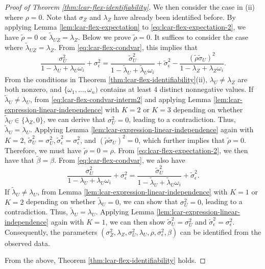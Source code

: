 \documentclass[11pt]{article}
\theoremstyle{definition}
\theoremstyle{remark}
\begin{document}
\begin{proof}[Proof of Theorem \ref{thm:lcar-flex-identifiability}]
We then consider the case in (ii) where $\rho =0$. Note that  $\sigma_Z$ and $\lambda_Z$ have already been identified before. By applying Lemma \ref{lem:lcar-flex-expectation} to \eqref{eq:lcar-flex-expectation-2}, we have $\tilde\rho =0$ or $\tilde\lambda_{UZ} = \lambda_Z$.
Below we prove $\tilde\rho =0$. 
It suffices to consider
the case where $\tilde\lambda_{UZ} =\lambda_Z$. From \eqref{eq:lcar-flex-condvar}, this implies that 
\begin{equation}\label{eq:lcar-flex-condvar-interm2}
\frac{\sigma_U^2}{1-\lambda_U+\lambda_U\omega_i} + \sigma_\epsilon^2 = \frac{\tilde\sigma_U^2}{1-\tilde\lambda_U+\tilde\lambda_U\omega_i} + \tilde\sigma_\epsilon^2 - \frac{(\tilde\rho\tilde\sigma_U)^2}{1-\lambda_Z +\lambda_Z\omega_i}.
\end{equation}
From the conditions in Theorem \ref{thm:lcar-flex-identifiability}(ii), $\lambda_U \ne \lambda_Z$ are both nonzero, and $\{\omega_1,\ldots,\omega_n)$ contains at least 4 distinct nonnegative values. 
If $\tilde\lambda_U \neq \lambda_U$, from \eqref{eq:lcar-flex-condvar-interm2} and applying Lemma \ref{lem:lcar-expression-linear-independence} with $K=2$ or $K=3$ depending on whether $\tilde\lambda_U\in\{\lambda_Z, 0\}$, we can derive that $\sigma_U^2=0$, leading to a contradiction. Thus, $\tilde\lambda_U = \lambda_U$. Applying Lemma \ref{lem:lcar-expression-linear-independence} again with $K=2$,  $\tilde\sigma_U^2 = \sigma_U^2, \tilde\sigma_\epsilon^2 = \sigma_\epsilon^2$, and $(\tilde\rho \tilde\sigma_U)^2=0$, which further implies that $\tilde\rho =0$. Therefore, we must have  $\tilde\rho=0 = \rho$. 
From \eqref{eq:lcar-flex-expectation-2}, we then have that $\tilde\beta = \beta$. From \eqref{eq:lcar-flex-condvar}, we also have
\[\frac{\sigma_U^2}{1-\lambda_U+\lambda_U \omega_i} + \sigma_\epsilon^2 = \frac{\tilde\sigma_U^2}{1-\tilde\lambda_U + \tilde\lambda_U \omega_i} + \tilde\sigma_\epsilon^2. \]
If $\tilde\lambda_U\neq \lambda_U $, from Lemma \ref{lem:lcar-expression-linear-independence} with $K=1$ or $K=2$ depending on whether $\tilde\lambda_U=0$, we can show that $\sigma_U^2=0$, leading to a contradiction. Thus, $\tilde\lambda_U=\lambda_U$.  Applying Lemma \ref{lem:lcar-expression-linear-independence} again with $K=1$, we can then show $\tilde\sigma_U^2 = \sigma_U^2$ and $\tilde\sigma_\epsilon^2 = \sigma_\epsilon^2$.
Consequently, the  parameters $(\sigma_Z^2, \lambda_Z, \sigma_U^2, \lambda_U, \rho, \sigma_\epsilon^2, \beta)$ can be identified from the observed data. 

From the above, Theorem \ref{thm:lcar-flex-identifiability} holds. 
\end{proof}
\end{document}
